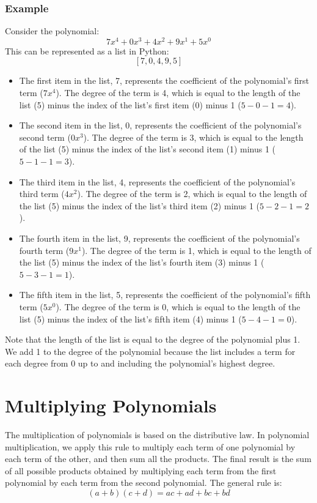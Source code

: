 \documentclass{article}
\begin{document}
\subsubsection*{Example}
Consider the polynomial:
$$ 7x^4 + 0x^3 + 4x^2 + 9x^1 + 5x^0 $$
This can be represented as a list in Python:
$$ [7, 0, 4, 9, 5] $$

\begin{itemize}
    \item The first item in the list, 7, represents the coefficient of the polynomial's first term (\( 7x^4 \)). The degree of the term is 4, which is equal to the length of the list (5) minus the index of the list's first item (0) minus 1 (\( 5 - 0 - 1 = 4 \)).
    \item The second item in the list, 0, represents the coefficient of the polynomial's second term (\( 0x^3 \)). The degree of the term is 3, which is equal to the length of the list (5) minus the index of the list's second item (1) minus 1 (\( 5 - 1 - 1 = 3 \)).
    \item The third item in the list, 4, represents the coefficient of the polynomial's third term (\( 4x^2 \)). The degree of the term is 2, which is equal to the length of the list (5) minus the index of the list's third item (2) minus 1 (\( 5 - 2 - 1 = 2 \)).
    \item The fourth item in the list, 9, represents the coefficient of the polynomial's fourth term (\( 9x^1 \)). The degree of the term is 1, which is equal to the length of the list (5) minus the index of the list's fourth item (3) minus 1 (\( 5 - 3 - 1 = 1 \)).
    \item The fifth item in the list, 5, represents the coefficient of the polynomial's fifth term (\( 5x^0 \)). The degree of the term is 0, which is equal to the length of the list (5) minus the index of the list's fifth item (4) minus 1 (\( 5 - 4 - 1 = 0 \)).
\end{itemize}

Note that the length of the list is equal to the degree of the polynomial plus 1. We add 1 to the degree of the polynomial because the list includes a term for each degree from 0 up to and including the polynomial's highest degree.

\section*{Multiplying Polynomials}

The multiplication of polynomials is based on the distributive law. In polynomial multiplication, we apply this rule to multiply each term of one polynomial by each term of the other, and then sum all the products. The final result is the sum of all possible products obtained by multiplying each term from the first polynomial by each term from the second polynomial. The general rule is:
$$ (a + b)(c + d) = ac + ad + bc + bd $$
\end{document}
